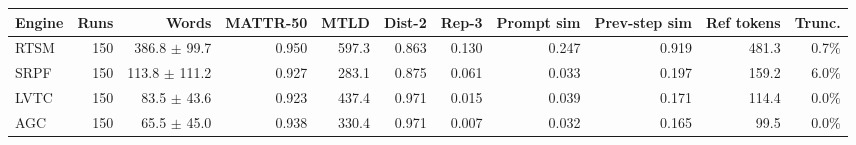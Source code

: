 \begin{tabular}{lrrrrrrrrrr}
\hline
Engine & Runs & Words & MATTR-50 & MTLD & Dist-2 & Rep-3 & Prompt sim & Prev-step sim & Ref tokens & Trunc. \\
\hline
RTSM & 150 & 386.8 $\pm$ 99.7 & 0.950 & 597.3 & 0.863 & 0.130 & 0.247 & 0.919 & 481.3 & 0.7\% \\
SRPF & 150 & 113.8 $\pm$ 111.2 & 0.927 & 283.1 & 0.875 & 0.061 & 0.033 & 0.197 & 159.2 & 6.0\% \\
LVTC & 150 & 83.5 $\pm$ 43.6 & 0.923 & 437.4 & 0.971 & 0.015 & 0.039 & 0.171 & 114.4 & 0.0\% \\
AGC & 150 & 65.5 $\pm$ 45.0 & 0.938 & 330.4 & 0.971 & 0.007 & 0.032 & 0.165 & 99.5 & 0.0\% \\
\hline
\end{tabular}
